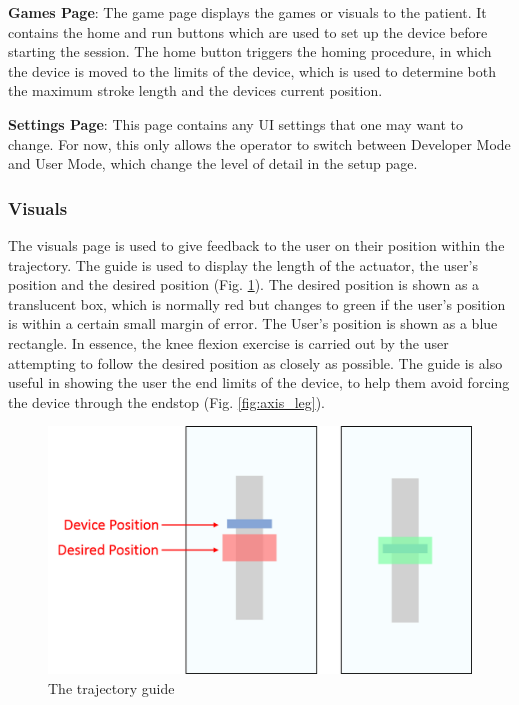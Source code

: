 \documentclass[12pt]{report}
\begin{document}
\textbf{Games Page}: The game page displays the games or visuals to the patient. It contains the home and run buttons which are used to set up the device before starting the session. The home button triggers the homing procedure, in which the device is moved to the limits of the device, which is used to determine both the maximum stroke length and the devices current position. 

\textbf{Settings Page}: This page contains any UI settings that one may want to change. For now, this only allows the operator to switch between Developer Mode and User Mode, which change the level of detail in the setup page. 		
		
		\subsubsection{Visuals} \label{sec:visuals} 
				
		The visuals page is used to give feedback to the user on their position within the trajectory. The guide is used to display the length of the actuator, the user's position and the desired position (Fig. \ref{fig:trajectory}). The desired position is shown as a translucent box, which is normally red but changes to green if the user's position is within a certain small margin of error. The User's position is shown as a blue rectangle. In essence, the knee flexion exercise is carried out by the user attempting to follow the desired position as closely as possible. The guide is also useful in showing the user the end limits of the device, to help them avoid forcing the device through the endstop (Fig. \ref{fig:axis_leg}).
		
	\begin{figure}[h] 
		\centering
		\includegraphics[width=0.75\linewidth]{UI_trajectory}
		\caption{The trajectory guide}
		\label{fig:trajectory}
	\end{figure} 
	
\end{document}
